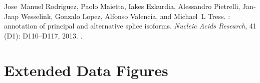 \documentclass[10pt]{article}
\begin{document}
\begin{thebibliography}{31}
	Jose~Manuel Rodriguez, Paolo Maietta, Iakes Ezkurdia, Alessandro Pietrelli,
	Jan-Jaap Wesselink, Gonzalo Lopez, Alfonso Valencia, and Michael~L Tress.
	: annotation of principal and alternative splice isoforms.
	\newblock \emph{Nucleic Acids Research}, 41 (D1): D110--D117,
	2013.
	\newblock {}.
\end{thebibliography}




\newpage
\section*{Extended Data Figures}

\setcounter{figure}{0}
\renewcommand{\figurename}{Extended Data Figure} 
\end{document}
